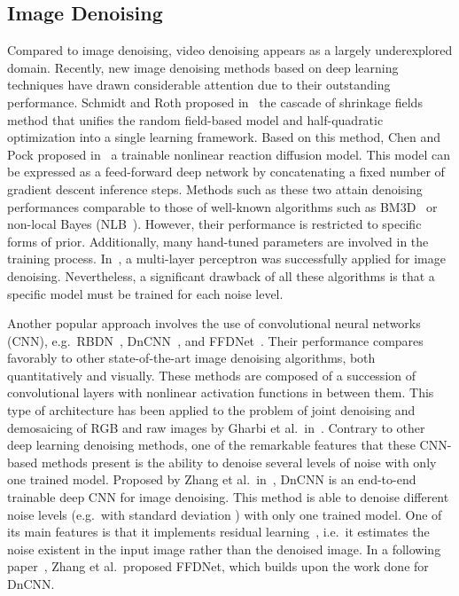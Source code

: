\documentclass{article}
\begin{document}
	\subsection{Image Denoising}
	\label{sec:image-denoising}
	
	Compared to image denoising, video denoising appears as a largely underexplored domain. Recently, new image denoising methods based on deep learning techniques have drawn considerable attention due to their outstanding performance. Schmidt and Roth proposed in~\cite{Schmidt2014a} the cascade of shrinkage fields method that unifies the random field-based model and half-quadratic optimization into a single learning framework. Based on this method, Chen and Pock proposed in~\cite{Chen2017} a trainable nonlinear reaction diffusion model. This model can be expressed as a feed-forward deep network by concatenating a fixed number of gradient descent inference steps. Methods such as these two attain denoising performances comparable to those of well-known algorithms such as BM3D~\cite{Dabov2007a} or non-local Bayes (NLB~\cite{Lebrun2013c}). However, their performance is restricted to specific forms of prior. Additionally, many hand-tuned parameters are involved in the training process. In~\cite{Burger2012}, a multi-layer perceptron was successfully applied for image denoising. Nevertheless, a significant drawback of all these algorithms is that a specific model must be trained for each noise level.
	
	Another popular approach involves the use of convolutional neural networks (CNN), e.g.\ RBDN~\cite{Santhanam2016}, DnCNN~\cite{Zhang2017}, and FFDNet~\cite{Zhang2017a}. Their performance compares favorably to other state-of-the-art image denoising algorithms, both quantitatively and visually. These methods are composed of a succession of convolutional layers with nonlinear activation functions in between them. This type of architecture has been applied to the problem of joint denoising and demosaicing of RGB and raw images by Gharbi et al.\ in~\cite{Gharbi2016}. Contrary to other deep learning denoising methods, one of the remarkable features that these CNN-based methods present is the ability to denoise several levels of noise with only one trained model. Proposed by Zhang et al.\ in~\cite{Zhang2017}, DnCNN is an end-to-end trainable deep CNN for image denoising. This method is able to denoise different noise levels (e.g.\ with standard deviation ) with only one trained model. One of its main features is that it implements residual learning~\cite{He2016}, i.e.\ it estimates the noise existent in the input image rather than the denoised image. In a following paper~\cite{Zhang2017a}, Zhang et al.\ proposed FFDNet, which builds upon the work done for DnCNN\@.
\end{document}
